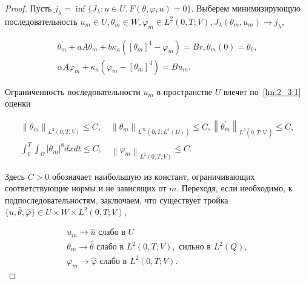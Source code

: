 \begin{proof}
    Пусть $j_{\lambda}=\inf \{ J_{\lambda} : u \in U, F(\theta, \varphi, u)=0\}$.
    Выберем минимизирующую последовательность
    $u_{m} \in U, \theta_{m} \in W, \varphi_{m} \in L^{2}(0, T; V),
    J_{\lambda}\left(\theta_{m}, u_{m}\right) \rightarrow j_{\lambda}$,

    \begin{equation}
        \label{eq:2_3:13}
        \begin{gathered}
            \theta_{m}^{\prime}+a A \theta_{m}
            + b \kappa_{a}\left(\left[\theta_{m}\right]^{4}
            - \varphi_{m}\right)=B r, \theta_{m}(0)=\theta_{0}, \\
            \alpha A \varphi_{m}+\kappa_{a}\left(\varphi_{m}-
            \left[\theta_{m}\right]^{4}\right)=B u_{m}.
        \end{gathered}
    \end{equation}

    Ограниченность последовательности $u_{m}$
    в пространстве $U$ влечет по~\ref{lm:2_3:1} оценки

    \[
        \begin{gathered}
            \left\|\theta_{m}\right\|_{L^{2}(0, T ; V)} \leq C,
            \quad\left\|\theta_{m}\right\|_{L^{\infty}\left(0, T; L^{5}(\Omega)\right)} \leq C,
            \left\|\theta_{m}^{\prime}\right\|_{L^{2}\left(0, T; V^{\prime}\right)} \leq C, \\
            \int_{0}^{T} \int_{\Omega}\left|\theta_{m}\right|^{8} d x d t \leq C,
            \quad\left\|\varphi_{m}\right\|_{L^{2}(0, T ; V)} \leq C.
        \end{gathered}
    \]

    Здесь $C>0$ обозначает наибольшую из констант,
    ограничивающих соответствующие нормы и не зависящих от $m$.
    Переходя, если необходимо, к подпоследовательностям, заключаем, что существует тройка
    $\{\widehat{u}, \widehat{\theta}, \widehat{\varphi}\}
    \in U \times W \times L^{2}(0, T; V)$,

    \[
        \begin{gathered}
            u_{m} \rightarrow \widehat{u} \text { слабо в } U \\
            \theta_{m} \rightarrow \widehat{\theta}
            \text{ слабо в } L^{2}(0, T; V), \text { сильно в } L^{2}(Q), \\
            \varphi_{m} \rightarrow \widehat{\varphi}
            \text{ слабо в }  L^{2}(0, T ; V).
        \end{gathered}
    \]



\end{proof}
